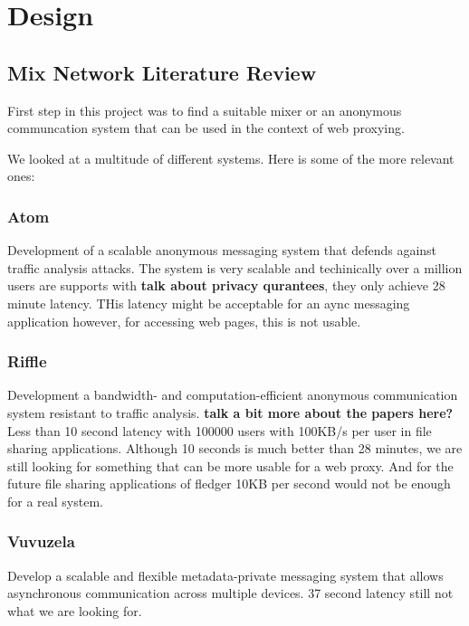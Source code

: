 \documentclass[a4paper,11pt,oneside]{report}
\begin{document}
\chapter{Design}


\section{Mix Network Literature Review}
First step in this project was to find a suitable mixer or an anonymous communcation system that can be used in the context of web proxying.

We looked at a multitude of different systems. Here is some of the more relevant ones:

\subsection{Atom}
Development of a scalable anonymous messaging system that defends against traffic analysis attacks. The system is very scalable and techinically over a million users are supports with \textbf{talk about privacy qurantees}, they only achieve 28 minute latency. THis latency might be acceptable for an aync messaging application however, for accessing web pages, this is not usable.

\subsection{Riffle}
Development a bandwidth- and computation-efficient anonymous communication system resistant to traffic analysis. \textbf{talk a bit more about the papers here?} Less than 10 second latency with 100000 users with 100KB/s per user in file sharing applications.  Although 10 seconds is much better than 28 minutes, we are still looking for something that can be more usable for a web proxy. And for the future file sharing applications of fledger 10KB per second would not be enough for a real system.
\subsection{Vuvuzela}
Develop a scalable and flexible metadata-private messaging system that allows asynchronous communication across multiple devices. 37 second latency still not what we are looking for. 
\end{document}
